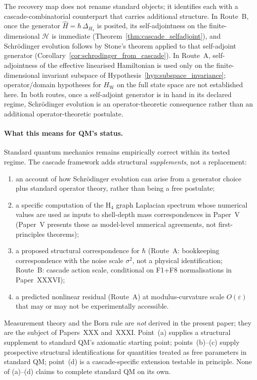 \documentclass[12pt]{article}
\newcommand{\HW}{H_{\mathrm{W}}}
\begin{document}
The recovery map does not rename standard objects; it identifies each with a cascade-combinatorial counterpart that carries additional structure. In Route~B, once the generator $\hat H = \hbar\,\Delta_{H_4}$ is posited, its self-adjointness on the finite-dimensional $\mathcal{H}$ is immediate (Theorem~\ref{thm:cascade_selfadjoint}), and Schr\"odinger evolution follows by Stone's theorem applied to that self-adjoint generator (Corollary~\ref{cor:schrodinger_from_cascade}). In Route~A, self-adjointness of the effective linearised Hamiltonian is used only on the finite-dimensional invariant subspace of Hypothesis~\ref{hyp:subspace_invariance}; operator/domain hypotheses for $\HW$ on the full state space are not established here. In both routes, once a self-adjoint generator is in hand in its declared regime, Schr\"odinger evolution is an operator-theoretic consequence rather than an additional operator-theoretic postulate.

\paragraph{What this means for QM's status.} Standard quantum mechanics remains empirically correct within its tested regime. The cascade framework adds structural \emph{supplements}, not a replacement:
\begin{enumerate}[label=(\alph*)]
    \item an account of how Schr\"odinger evolution can arise from a generator choice plus standard operator theory, rather than being a free postulate;
    \item a specific computation of the H${}_4$ graph Laplacian spectrum whose numerical values are used as inputs to shell-depth mass correspondences in Paper~V (Paper~V presents these as model-level numerical agreements, not first-principles theorems);
    \item a proposed structural correspondence for $\hbar$ (Route~A: bookkeeping correspondence with the noise scale $\sigma^2$, not a physical identification; Route~B: cascade action scale, conditional on F1+F8 normalisations in Paper~XXXVI);
    \item a predicted nonlinear residual (Route~A) at modulus-curvature scale $O(\varepsilon)$ that may or may not be experimentally accessible.
\end{enumerate}
Measurement theory and the Born rule are \emph{not} derived in the present paper; they are the subject of Papers~XXX and~XXXI. Point~(a) supplies a structural supplement to standard QM's axiomatic starting point; points~(b)--(c) supply prospective structural identifications for quantities treated as free parameters in standard QM; point~(d) is a cascade-specific extension testable in principle. None of (a)--(d) claims to complete standard QM on its own.
\end{document}
